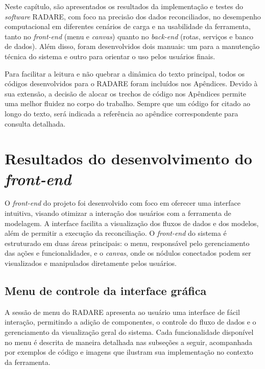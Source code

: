 \label{Cap:Resultados}

Neste capítulo, são apresentados os resultados da implementação e testes do \textit{software} RADARE, com foco na precisão dos dados reconciliados, no desempenho computacional em diferentes cenários de carga e na usabilidade da ferramenta, tanto no \textit{front-end} (menu e \textit{canvas}) quanto no \textit{back-end} (rotas, serviços e banco de dados). Além disso, foram desenvolvidos dois manuais: um para a manutenção técnica do sistema e outro para orientar o uso pelos usuários finais.

Para facilitar a leitura e não quebrar a dinâmica do texto principal, todos os códigos desenvolvidos para o RADARE foram incluídos nos Apêndices. Devido à sua extensão, a decisão de alocar os trechos de código nos Apêndices permite uma melhor fluidez no corpo do trabalho. Sempre que um código for citado ao longo do texto, será indicada a referência ao apêndice correspondente para consulta detalhada.

\section{Resultados do desenvolvimento do \textit{front-end}} 

O \textit{front-end} do projeto  foi desenvolvido com foco em oferecer uma interface intuitiva, visando otimizar a interação dos usuários com a ferramenta de modelagem. A interface facilita a visualização dos fluxos de dados e dos modelos, além de permitir a execução da reconciliação. O  \textit{front-end} do sistema é estruturado em duas áreas principais: o menu, responsável pelo gerenciamento das ações e funcionalidades, e o \textit{canvas}, onde os nódulos conectados podem ser visualizados e manipulados diretamente pelos usuários.

\subsection{Menu de controle da interface gráfica} 

A sessão de menu do RADARE apresenta ao usuário uma interface de fácil interação, permitindo a adição de componentes, o controle do fluxo de dados e o gerenciamento da visualização geral do sistema. Cada funcionalidade disponível no menu é descrita de maneira detalhada nas subseções a seguir, acompanhada por exemplos de código e imagens que ilustram sua implementação no contexto da ferramenta.

